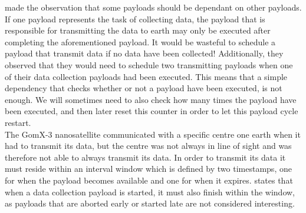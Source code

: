 \cite{gomx3} made the observation that some payloads should be dependant on other payloads. If one payload represents the task of collecting data, the payload that is responsible for transmitting the data to earth may only be executed after completing the aforementioned payload. It would be wasteful to schedule a payload that transmit data if no data have been collected! Additionally, they observed that they would need to schedule two transmitting payloads when one of their data collection payloads had been executed. This means that a simple dependency that checks whether or not a payload have been executed, is not enough. We will sometimes need to also check how many times the payload have been executed, and then later reset this counter in order to let this payload cycle restart.\\
The GomX-3 nanosatellite communicated with a specific centre one earth when it had to transmit its data, but the centre was not always in line of sight and was therefore not able to always transmit its data. In order to transmit its data it must reside within an interval window which is defined by two timestamps, one for when the payload becomes available and one for when it expires. \cite{gomx3} states that when a data collection payload is started, it must also finish within the window, as payloads that are aborted early or started late are not considered interesting.